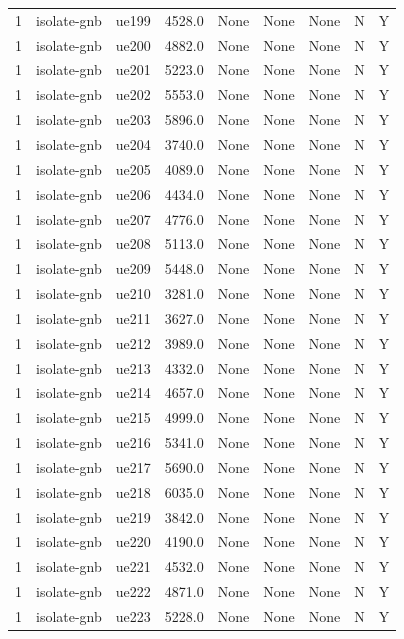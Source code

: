 \begin{table}[ht]
\begin{tabular}{|c|c|c|c|c|c|c|c|c|}
1 & isolate-gnb & ue199 & 4528.0 & None & None & None & N & Y \\
1 & isolate-gnb & ue200 & 4882.0 & None & None & None & N & Y \\
1 & isolate-gnb & ue201 & 5223.0 & None & None & None & N & Y \\
1 & isolate-gnb & ue202 & 5553.0 & None & None & None & N & Y \\
1 & isolate-gnb & ue203 & 5896.0 & None & None & None & N & Y \\
1 & isolate-gnb & ue204 & 3740.0 & None & None & None & N & Y \\
1 & isolate-gnb & ue205 & 4089.0 & None & None & None & N & Y \\
1 & isolate-gnb & ue206 & 4434.0 & None & None & None & N & Y \\
1 & isolate-gnb & ue207 & 4776.0 & None & None & None & N & Y \\
1 & isolate-gnb & ue208 & 5113.0 & None & None & None & N & Y \\
1 & isolate-gnb & ue209 & 5448.0 & None & None & None & N & Y \\
1 & isolate-gnb & ue210 & 3281.0 & None & None & None & N & Y \\
1 & isolate-gnb & ue211 & 3627.0 & None & None & None & N & Y \\
1 & isolate-gnb & ue212 & 3989.0 & None & None & None & N & Y \\
1 & isolate-gnb & ue213 & 4332.0 & None & None & None & N & Y \\
1 & isolate-gnb & ue214 & 4657.0 & None & None & None & N & Y \\
1 & isolate-gnb & ue215 & 4999.0 & None & None & None & N & Y \\
1 & isolate-gnb & ue216 & 5341.0 & None & None & None & N & Y \\
1 & isolate-gnb & ue217 & 5690.0 & None & None & None & N & Y \\
1 & isolate-gnb & ue218 & 6035.0 & None & None & None & N & Y \\
1 & isolate-gnb & ue219 & 3842.0 & None & None & None & N & Y \\
1 & isolate-gnb & ue220 & 4190.0 & None & None & None & N & Y \\
1 & isolate-gnb & ue221 & 4532.0 & None & None & None & N & Y \\
1 & isolate-gnb & ue222 & 4871.0 & None & None & None & N & Y \\
1 & isolate-gnb & ue223 & 5228.0 & None & None & None & N & Y \\

\end{tabular}
\end{table}
